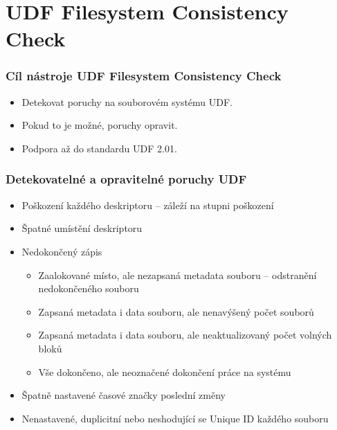 \documentclass[aspectratio=169]{beamer}
\newcommand{\cmark}{\ding{51}}%
\begin{document}
    \section{UDF Filesystem Consistency Check}
        \begin{frame}
            \frametitle{Cíl nástroje UDF Filesystem Consistency Check}
            \vspace{30pt}
            \begin{itemize}
                \huge\item Detekovat poruchy na souborovém systému UDF.
                \huge\item Pokud to je možné, poruchy opravit.
                \huge\item Podpora až do standardu UDF 2.01.
            \end{itemize}
        \end{frame}
		\begin{frame}
			\frametitle{Detekovatelné a opravitelné poruchy UDF }
			\vspace{40 pt}
            \begin{itemize}
                \Large\item Poškození každého deskriptoru -- záleží na stupni poškození
                \Large\item Špatné umístění deskriptoru
                \Large\item Nedokončený zápis 
                    \begin{itemize}
                        \large\item Zaalokované místo, ale nezapsaná metadata souboru -- odstranění nedokončeného souboru
                        \large\item Zapsaná metadata i data souboru, ale nenavýšený počet souborů
                        \large\item Zapsaná metadata i data souboru, ale neaktualizovaný počet volných bloků
                        \large\item Vše dokončeno, ale neoznačené dokončení práce na systému
                    \end{itemize}
                \Large\item Špatně nastavené časové značky poslední změny
                \Large\item Nenastavené, duplicitní nebo neshodující se Unique ID každého souboru
            \end{itemize}
		\end{frame}
\end{document}
